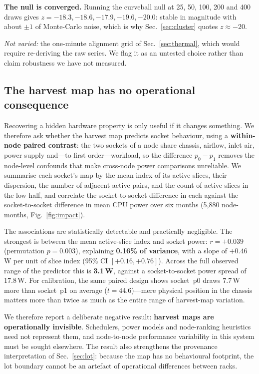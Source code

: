 \documentclass[10pt,conference]{IEEEtran}
\begin{document}
\textbf{The null is converged.} Running the curveball null at 25, 50, 100, 200 and 400 draws gives
$z = -18.3, -18.6, -17.9, -19.6, -20.0$: stable in magnitude with about $\pm1$ of Monte-Carlo
noise, which is why Sec.~\ref{sec:cluster} quotes $z\approx-20$.

\emph{Not varied:} the one-minute alignment grid of Sec.~\ref{sec:thermal}, which would require
re-deriving the raw series. We flag it as an untested choice rather than claim robustness we have
not measured.

\subsection{The harvest map has no operational consequence}
\label{sec:impact}
Recovering a hidden hardware property is only useful if it changes something. We therefore ask
whether the harvest map predicts socket behaviour, using a \textbf{within-node paired contrast}:
the two sockets of a node share chassis, airflow, inlet air, power supply and---to first
order---workload, so the difference $p_0-p_1$ removes the node-level confounds that make
cross-node power comparisons unreliable. We summarise each socket's map by the mean index of its
active slices, their dispersion, the number of adjacent active pairs, and the count of active
slices in the low half, and correlate the socket-to-socket difference in each against the
socket-to-socket difference in mean CPU power over six months (5{,}880 node-months,
Fig.~\ref{fig:impact}).

The associations are statistically detectable and practically negligible. The strongest is between
the mean active-slice index and socket power: $r=+0.039$ (permutation $p=0.003$), explaining
\textbf{0.16\% of variance}, with a slope of $+0.46$\,W per unit of slice index
(95\% CI $[+0.16,+0.76]$). Across the full observed range of the predictor this is
\textbf{3.1\,W}, against a socket-to-socket power spread of 17.8\,W. For calibration, the same
paired design shows socket~p0 draws $7.7$\,W more than socket~p1 on average ($t=44.6$)---mere
physical position in the chassis matters more than twice as much as the entire range of harvest-map
variation.

We therefore report a deliberate negative result: \textbf{harvest maps are operationally
invisible}. Schedulers, power models and node-ranking heuristics need not represent them, and
node-to-node performance variability in this system must be sought elsewhere. The result also
strengthens the provenance interpretation of Sec.~\ref{sec:lot}: because the map has no
behavioural footprint, the lot boundary cannot be an artefact of operational differences between
racks.
\end{document}
